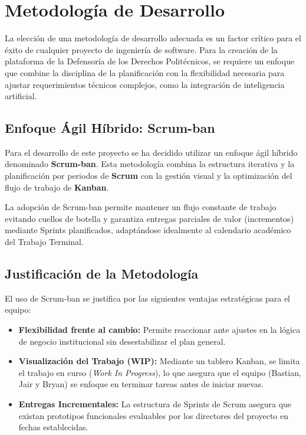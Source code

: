 
\chapter{Metodología de Desarrollo}
\label{cap:metodologia}

\begin{flushleft}
La elección de una metodología de desarrollo adecuada es un factor crítico para el éxito de cualquier proyecto de ingeniería de software. Para la creación de la plataforma de la Defensoría de los Derechos Politécnicos, se requiere un enfoque que combine la disciplina de la planificación con la flexibilidad necesaria para ajustar requerimientos técnicos complejos, como la integración de inteligencia artificial.
\end{flushleft}

\justifying

\section{Enfoque Ágil Híbrido: Scrum-ban}
Para el desarrollo de este proyecto se ha decidido utilizar un enfoque ágil híbrido denominado \textbf{Scrum-ban}. Esta metodología combina la estructura iterativa y la planificación por periodos de \textbf{Scrum} con la gestión visual y la optimización del flujo de trabajo de \textbf{Kanban}. 

La adopción de Scrum-ban permite mantener un flujo constante de trabajo evitando cuellos de botella y garantiza entregas parciales de valor (incrementos) mediante Sprints planificados, adaptándose idealmente al calendario académico del Trabajo Terminal.

\section{Justificación de la Metodología}
El uso de Scrum-ban se justifica por las siguientes ventajas estratégicas para el equipo:
\begin{itemize}
    \item \textbf{Flexibilidad frente al cambio:} Permite reaccionar ante ajustes en la lógica de negocio institucional sin desestabilizar el plan general.
    \item \textbf{Visualización del Trabajo (WIP):} Mediante un tablero Kanban, se limita el trabajo en curso (\textit{Work In Progress}), lo que asegura que el equipo (Bastian, Jair y Bryan) se enfoque en terminar tareas antes de iniciar nuevas.
    \item \textbf{Entregas Incrementales:} La estructura de Sprints de Scrum asegura que existan prototipos funcionales evaluables por los directores del proyecto en fechas establecidas.
\end{itemize}

